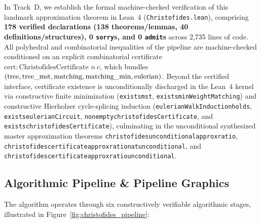 \documentclass[11pt,a4paper]{article}
\renewcommand{\_}{\origunderscore\allowbreak}
\theoremstyle{plain}
\theoremstyle{definition}
\theoremstyle{remark}
\begin{document}
In Track~D, we establish the formal machine-checked verification of this landmark approximation theorem in Lean~4 (\texttt{Christofides.lean}), comprising \textbf{178 verified declarations (138 theorems/lemmas, 40 definitions/structures), 0 \texttt{sorry}s, and 0 \texttt{admit}s} across 2,735 lines of code. All polyhedral and combinatorial inequalities of the pipeline are machine-checked conditioned on an explicit combinatorial certificate $\text{cert} : \text{ChristofidesCertificate } n\ c$, which bundles $(\text{tree}, \text{tree\_mst}, \text{matching}, \text{matching\_min}, \text{eulerian})$. Beyond the certified interface, certificate existence is unconditionally discharged in the Lean~4 kernel via constructive finite minimization (\texttt{exists\_mst}, \texttt{exists\_min\allowbreak Weight\allowbreak Matching}) and constructive Hierholzer cycle-splicing induction (\texttt{eulerianWalkInduction\_holds}, \texttt{exists\_eulerian\allowbreak Circuit}, \texttt{nonempty\_christofides\allowbreak Certificate}, and \texttt{exists\_christofides\allowbreak Certificate}), culminating in the unconditional synthesized master approximation theorems \texttt{christofides\_unconditional\_approx\_ratio}, \texttt{christofides\_certificate\_approx\_ratio\_nat\_unconditional}, and \texttt{christofides\_certificate\_approx\_ratio\_unconditional}.

\subsection{Algorithmic Pipeline \& Pipeline Graphics}
The algorithm operates through six constructively verifiable algorithmic stages, illustrated in Figure~\ref{fig:christofides_pipeline}:
\end{document}
